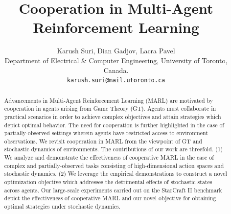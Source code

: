 \documentclass{article}
\title{Cooperation in Multi-Agent Reinforcement Learning}
\author{
  Karush Suri, Dian Gadjov, Lacra Pavel\\
   Department of Electrical \& Computer Engineering, University of Toronto, Canada.\\
  \texttt{karush.suri@mail.utoronto.ca}
}
\begin{document}
\maketitle

\begin{abstract}
Advancements in Multi-Agent Reinforcement Learning (MARL) are motivated by cooperation in agents arising from Game Theory (GT). Agents must collaborate in practical scenarios in order to achieve complex objectives and attain strategies which depict optimal behavior. The need for cooperation is further highlighted in the case of partially-observed settings wherein agents have restricted access to environment observations. We revisit cooperation in MARL from the viewpoint of GT and stochastic dynamics of environments. The contributions of our work are threefold. (1) We analyze and demonstrate the effectiveness of cooperative MARL in the case of complex and partially-observed tasks consisting of high-dimensional action spaces and stochastic dynamics. (2) We leverage the empirical demonstrations to construct a novel optimization objective which addresses the detrimental effects of stochastic states across agents. Our large-scale experiments carried out on the StarCraft II benchmark depict the effectiveness of cooperative MARL and our novel objective for obtaining optimal strategies under stochastic dynamics. 

\end{abstract}
\end{document}
